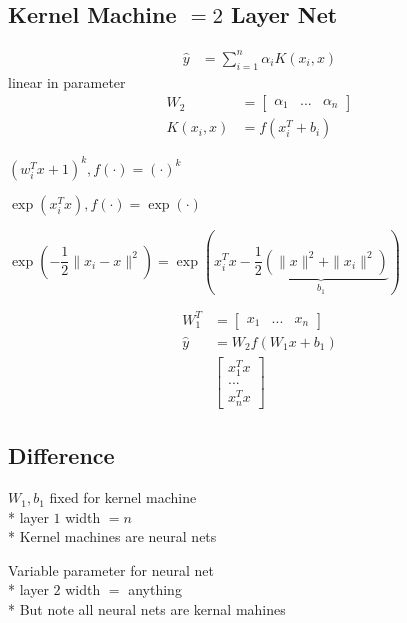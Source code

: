 \documentclass{article}
\begin{document}
\subsection{Kernel Machine $= 2$ Layer Net}
\begin{align*}
\hat{y} &= \displaystyle\sum_{i=1}^{n} \alpha_{i} K\left(x_{i}, x\right)
\end{align*}
linear  in parameter
\begin{align*}
W_{2} &= \begin{bmatrix} \alpha_{1} & ... & \alpha_{n} \end{bmatrix}
\\ K\left(x_{i}, x\right)  &= f\left(x_{i}^{T} + b_{i}\right)
\end{align*}
\begin{eg} \label{eg:km1} 
$\left(w_{i}^{T} x + 1\right)^{k}, f\left(\cdot \right) = \left(\cdot \right)^{k}$
\end{eg}
\begin{eg} \label{eg:km2} 
$\exp\left(x_{i}^{T} x\right), f\left(\cdot \right) = \exp\left(\cdot \right)$
\end{eg}
\begin{eg} \label{eg:km3} 
$\exp\left(- \dfrac{1}{2} \| x_{i} - x \|^{2}\right) = \exp\left(x_{i}^{T} x - \underbrace{\dfrac{1}{2} \left(\| x \|^{2}  + \| x_{i} \|^{2}\right)}_{b_{1}}\right)$
\end{eg}
\begin{align*}
W_{1}^{T} &= \begin{bmatrix} x_{1} & ... & x_{n} \end{bmatrix}
\\ \hat{y} &= W_{2} f\left(W_{1} x + b_{1}\right)
\\ &\begin{bmatrix} x_{1}^{T} x \\ ... \\ x_{n}^{T} x \end{bmatrix}
\end{align*}


\subsection{Difference}
$W_{1}, b_{1}$ fixed for kernel machine
\\* layer $1$ width $= n $
\\* Kernel machines are neural nets

Variable parameter for neural net
\\* layer $2$ width $=$ anything
\\* But note all neural nets are kernal mahines
\end{document}
